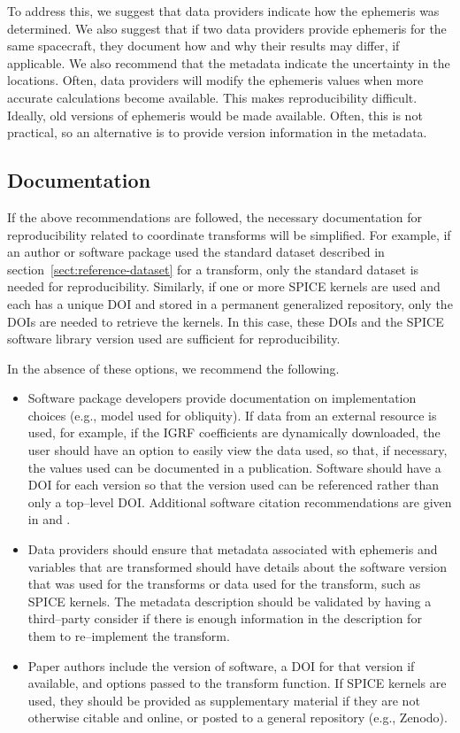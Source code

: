 \documentclass[draft]{agujournal2019}
\begin{document}
To address this, we suggest that data providers indicate how the ephemeris was determined. We also suggest that if two data providers provide ephemeris for the same spacecraft, they document how and why their results may differ, if applicable. We also recommend that the metadata indicate the uncertainty in the locations. Often, data providers will modify the ephemeris values when more accurate calculations become available. This makes reproducibility difficult. Ideally, old versions of ephemeris would be made available. Often, this is not practical, so an alternative is to provide version information in the metadata.

\subsection{Documentation}

If the above recommendations are followed, the necessary documentation for reproducibility related to coordinate transforms will be simplified. For example, if an author or software package used the standard dataset described in section~\ref{sect:reference-dataset} for a transform, only the standard dataset is needed for reproducibility. Similarly, if one or more SPICE kernels are used and each has a unique DOI and stored in a permanent generalized repository, only the DOIs are needed to retrieve the kernels. In this case, these DOIs and the SPICE software library version used are sufficient for reproducibility.

In the absence of these options, we recommend the following.

\begin{itemize}
  \item Software package developers provide documentation on implementation choices (e.g., model used for obliquity). If data from an external resource is used, for example, if the IGRF coefficients are dynamically downloaded, the user should have an option to easily view the data used, so that, if necessary, the values used can be documented in a publication.
  Software should have a DOI for each version so that the version used can be referenced rather than only a top--level DOI. Additional software citation recommendations are given in  and .
  \item Data providers should ensure that metadata associated with ephemeris and variables that are transformed should have details about the software version that was used for the transforms or data used for the transform, such as SPICE kernels. The metadata description should be validated by having a third--party consider if there is enough information in the description for them to re--implement the transform.
  \item Paper authors include the version of software, a DOI for that version if available, and options passed to the transform function. If SPICE kernels are used, they should be provided as supplementary material if they are not otherwise citable and online, or posted to a general repository (e.g., Zenodo). 

\end{itemize}
\end{document}
